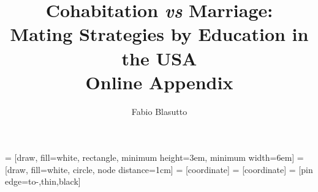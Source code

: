 \documentclass[12pt]{article}
\title{Cohabitation \textit{vs} Marriage:\\ Mating Strategies by Education in the USA \\ \textbf{Online Appendix}}
\author{Fabio Blasutto}
\begin{document}

 	 = [draw, fill=white, rectangle, 
 	minimum height=3em, minimum width=6em]
 	 = [draw, fill=white, circle, node distance=1cm]
 	 = [coordinate]
 	 = [coordinate]
 	 = [pin edge={to-,thin,black}]
 	
 	



	\maketitle
\appendix
{}
\end{document}
